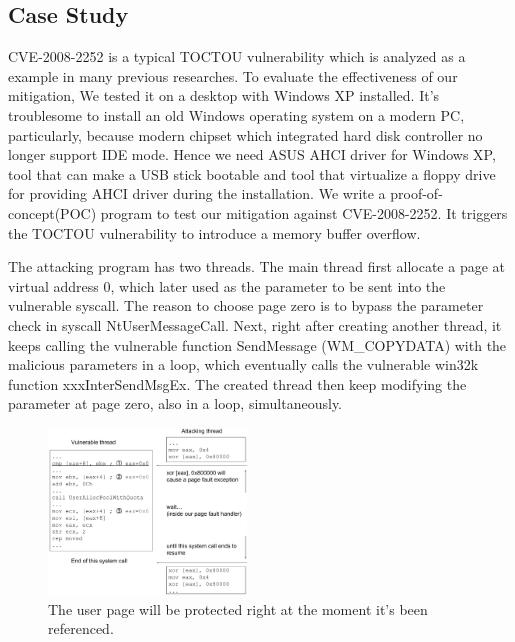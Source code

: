 \subsection{Case Study}

CVE-2008-2252 is a typical TOCTOU vulnerability which is analyzed as a example in many previous researches. To evaluate the effectiveness of our mitigation, We tested it on a desktop with Windows XP installed. It's troublesome to install an old Windows operating system on a modern PC, particularly, because modern chipset which integrated hard disk controller no longer support IDE mode. Hence we need ASUS AHCI driver for Windows XP, tool that can make a USB stick bootable and tool that virtualize a floppy drive~\cite{installxpskylake} for providing AHCI driver during the installation.
We write a proof-of-concept(POC) program to test our mitigation against CVE-2008-2252. It triggers the TOCTOU vulnerability to introduce a memory buffer overflow. 


The attacking program has two threads. The main thread first allocate a page at virtual address 0, which later used as the parameter to be sent into the vulnerable syscall. The reason to choose page zero is to bypass the parameter check in syscall NtUserMessageCall. Next, right after creating another thread, it keeps calling the vulnerable function SendMessage (WM\_COPYDATA) with the malicious parameters in a loop, which eventually calls the vulnerable win32k function xxxInterSendMsgEx. The created thread then keep modifying the parameter at page zero, also in a loop, simultaneously.

\begin{figure}[th]
  \includegraphics[width=0.47\textwidth]{figures/ms08061case}
  \centering
  \caption{The user page will be protected right at the moment it's been referenced.}
  \label{fig:ms08061case}
\end{figure}

